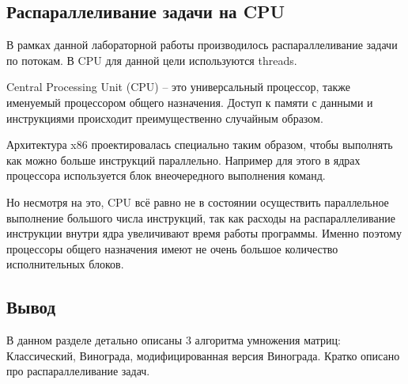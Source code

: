 \documentclass[../main.tex]{subfiles}
\begin{document}
	\subsection{Распараллеливание задачи на CPU}
		
		В рамках данной лабораторной работы производилось распараллеливание задачи по потокам. 
		В CPU для данной цели используются threads.
		
		Central Processing Unit (CPU) – это универсальный процессор, также именуемый процессором общего назначения. 
		Доступ к памяти с данными и инструкциями происходит преимущественно случайным образом.
		
		Архитектура x86 проектировалась специально таким образом, чтобы выполнять как можно больше инструкций параллельно. 
		Например для этого в ядрах процессора используется блок внеочередного выполнения команд.
		
		Но несмотря на это, CPU всё равно не в состоянии осуществить параллельное выполнение большого числа инструкций, так как расходы на распараллеливание инструкции внутри ядра увеличивают время работы программы. 
		Именно поэтому процессоры общего назначения имеют не очень большое количество исполнительных блоков.
	
	\subsection{Вывод}
	
	В данном разделе детально описаны 3 алгоритма умножения матриц: Классический, Винограда, модифицированная версия Винограда. Кратко описано про распараллеливание задач.
	
\end{document}
